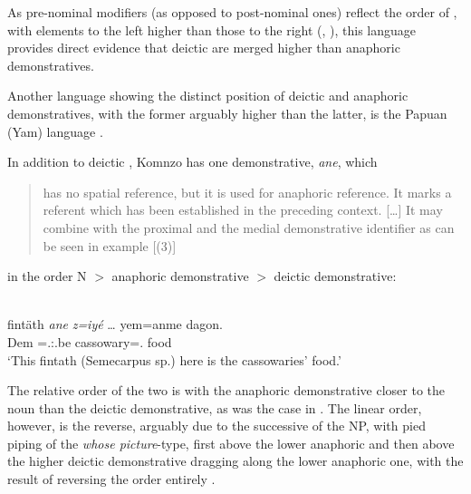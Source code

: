 \documentclass[output=paper]{langsci/langscibook}
\begin{document}
As pre-nominal modifiers (as opposed to post-nominal ones) reflect the order of
, with elements to the left higher than those to the right
(\citealt{Kayne1994}, \citealt{Cinque2009,Cinque2017}), this language provides
direct evidence that deictic  are merged higher than anaphoric
demonstratives.

Another language showing the distinct  position of deictic and anaphoric
demonstratives, with the former arguably higher than the latter, is the Papuan
(Yam) language .

In addition to deictic , Komnzo has one demonstrative, \emph{ane},
which \blockquote[{\citealt[128f]{Dohler2016}}]{has no spatial reference, but
    it is used for anaphoric reference. It marks a referent which has been
    established in the preceding context. [\dots] It may combine with the
proximal and the medial demonstrative identifier as can be seen in example
[(3)]} in the order N $>$ anaphoric demonstrative $>$ deictic demonstrative:

\ea\label{ex:09.3}  \parencite[129]{Dohler2016}\\
    \gll fintäth \textit{ane} \textit{z=iyé} \dots{}  yem=anme  dagon.\\
        \Propn{}  Dem \Prox=\Tsg.\M:\Npst{}.be {} cassowary=\Poss.\Nsg{} food\\
	\glt ‘This fintath (Semecarpus sp.) here is the cassowaries’ food.’
\z

The relative order of the two is with the anaphoric demonstrative closer to the
noun than the deictic demonstrative, as was the case in .
The linear order, however, is the reverse, arguably due to the successive
 of the NP, with pied piping of the
\emph{whose picture}-type, first above the lower anaphoric and then above the
higher deictic demonstrative dragging along the lower anaphoric one,
with the result of reversing the order entirely
\parencite[cf.][]{Cinque2005,Cinque2017}.\largerpage[-1]
\end{document}
